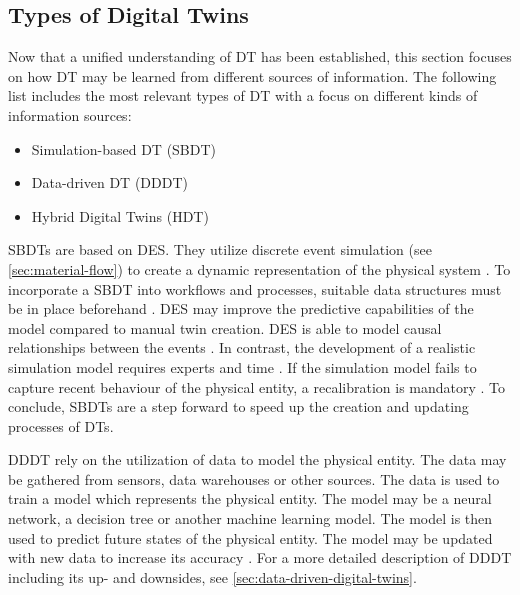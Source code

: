 \subsection{Types of Digital Twins}
\label{sec:types-digital-twins}
Now that a unified understanding of DT has been established, this section focuses on how DT may be learned from different sources of information. The following list includes the most relevant types of DT with a focus on different kinds of information sources:

\begin{itemize}
  \item Simulation-based DT (SBDT) \autocite{Lugaresi2021aifac,martinez2018automatic}
  \item Data-driven DT (DDDT) \autocite{he2019data,Friederich2022}
  \item Hybrid Digital Twins (HDT) \autocite{luo2020hybrid,huang2023hybrid}
\end{itemize}


SBDTs \autocite{Lugaresi2021aifac,martinez2018automatic,boschert2016digital} are based on DES. They utilize discrete event simulation (see \autoref{sec:material-flow}) to create a dynamic representation of the physical system \autocite{schluse2016simulation,pantelides2013online}. To incorporate a SBDT into workflows and processes, suitable data structures must be in place beforehand \autocite{boschert2016digital}. DES may improve the predictive capabilities of the model compared to manual twin creation. DES is able to model causal relationships between the events \autocite{francis2021towards}. In contrast, the development of a realistic simulation model requires experts and time \autocite{Charpentier2014}. If the simulation model fails to capture recent behaviour of the physical entity, a recalibration is mandatory \autocite{Friederich2022}. To conclude, SBDTs are a step forward to speed up the creation and updating processes of DTs.

DDDT rely on the utilization of data to model the physical entity. The data may be gathered from sensors, data warehouses or other sources. The data is used to train a model which represents the physical entity. The model may be a neural network, a decision tree or another machine learning model. The model is then used to predict future states of the physical entity. The model may be updated with new data to increase its accuracy \autocite{he2019data,Friederich2022}. For a more detailed description of DDDT including its up- and downsides, see \autoref{sec:data-driven-digital-twins}.

